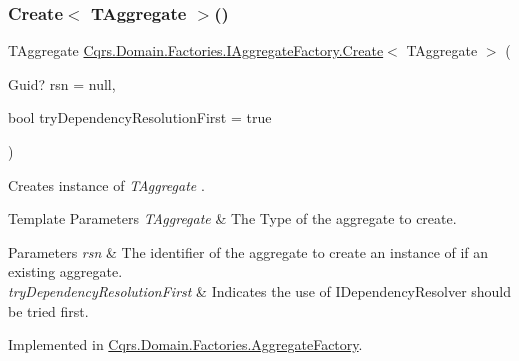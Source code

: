 \mbox{\label{interfaceCqrs_1_1Domain_1_1Factories_1_1IAggregateFactory_a3dcbf8900e0d536da241e2e94f74cdd5_a3dcbf8900e0d536da241e2e94f74cdd5}} 
\subsubsection{\texorpdfstring{Create$<$ T\+Aggregate $>$()}{Create< TAggregate >()}}
{\footnotesize\ttfamily T\+Aggregate \hyperlink{interfaceCqrs_1_1Domain_1_1Factories_1_1IAggregateFactory_ade388f0dfa9c42964392159a4f97fb1e_ade388f0dfa9c42964392159a4f97fb1e}{Cqrs.\+Domain.\+Factories.\+I\+Aggregate\+Factory.\+Create}$<$ T\+Aggregate $>$ (\begin{DoxyParamCaption}\item[{Guid?}]{rsn = {\ttfamily null},  }\item[{bool}]{try\+Dependency\+Resolution\+First = {\ttfamily true} }\end{DoxyParamCaption})}



Creates instance of {\itshape T\+Aggregate} . 


\begin{DoxyTemplParams}{Template Parameters}
{\em T\+Aggregate} & The Type of the aggregate to create.\\
\hline
\end{DoxyTemplParams}

\begin{DoxyParams}{Parameters}
{\em rsn} & The identifier of the aggregate to create an instance of if an existing aggregate.\\
\hline
{\em try\+Dependency\+Resolution\+First} & Indicates the use of I\+Dependency\+Resolver should be tried first.\\
\hline
\end{DoxyParams}


Implemented in \hyperlink{classCqrs_1_1Domain_1_1Factories_1_1AggregateFactory_ac155d6c1e55ba37bacf420185b652092_ac155d6c1e55ba37bacf420185b652092}{Cqrs.\+Domain.\+Factories.\+Aggregate\+Factory}.

